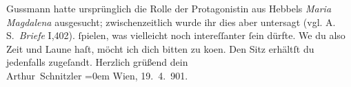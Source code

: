 \begin{ledgroupsized}[t]{13cm}
{{{                     Gussmann hatte ursprünglich die Rolle der Protagonistin aus Hebbels \emph{Maria
                     Magdalena} ausgesucht; zwischenzeitlich wurde ihr dies aber untersagt
                     (vgl. A. S. \emph{Briefe} I,402).}}}\label{K_L01110_2h}{ }ſpielen, was vielleicht noch intereſſanter ſein
               dürfte. We{\geminationn} du also Zeit {\pb}und Laune haſt, möcht
               ich dich bitten zu ko{\geminationm}en. Den Sitz erhältſt du
               jedenfalls zugeſandt.\pend
           \pstart
           Herzlich grüßend dein{\\[\baselineskip]}\spacefill\mbox{Arthur Schnitzler}\pend
           \leftskip=0em{}\pstart
           Wien, 19. 4. 901.\pend
                     \endnumbering{}\end{ledgroupsized}  \newcommand{\dateiname}{L01110}\newcommand{\titel}{Arthur Schnitzler an Hermann Bahr, 19. 4. 1901}\newcommand{\editorInnen}{ Kurt Ifkovits,  Martin Anton Müller}
            \footnotesize
\begin{ledgroupsized}[t]{11.5cm}
\end{ledgroupsized}
         
      